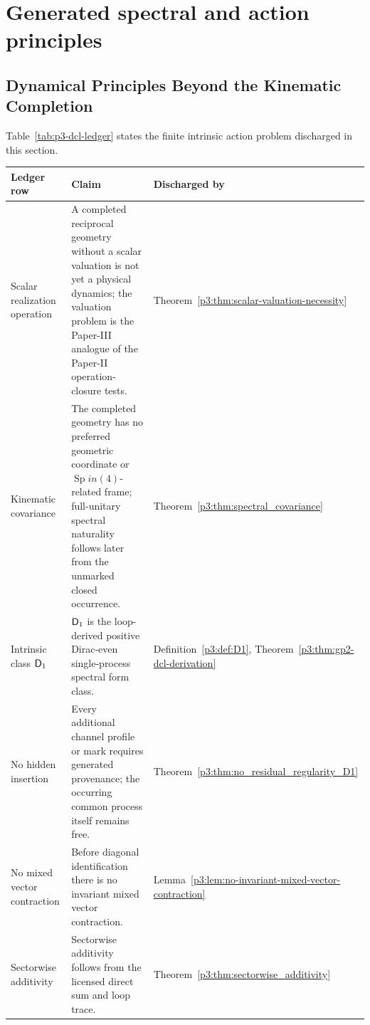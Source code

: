 \documentclass[12pt,a4paper]{article}
\begin{document}
\clearpage
\section{Generated spectral and action principles}
\label{paper3b:sec:organized-principles}
\subsection{Dynamical Principles Beyond the Kinematic Completion}
\label{p3:sec:dyn-principles}

Table~\ref{tab:p3-dcl-ledger} states the finite intrinsic action problem discharged in this section.

\begin{table}[H]
\centering
\small
\begingroup
\setlength{\tabcolsep}{3pt}
\renewcommand{\arraystretch}{1.15}
\begin{tabular}{@{}
  L{3.0cm}
  L{9cm}
  L{\dimexpr\linewidth-12cm-4\tabcolsep\relax}
@{}}
\toprule
\textbf{Ledger row}
& \textbf{Claim}
& \textbf{Discharged by} \\
\midrule
Scalar realization operation
& A completed reciprocal geometry without a scalar valuation is not yet a physical dynamics; the valuation problem is the Paper-III analogue of the Paper-II operation-closure tests.
& Theorem~\ref{p3:thm:scalar-valuation-necessity} \\

Kinematic covariance
& The completed geometry has no preferred geometric coordinate or
\(\operatorname{Sp}in(4)\)-related frame; full-unitary spectral naturality follows later
from the unmarked closed occurrence.
& Theorem~\ref{p3:thm:spectral_covariance} \\

Intrinsic class \(\mathsf{D}_1\)
& \(\mathsf{D}_1\) is the loop-derived positive Dirac-even single-process spectral form class.
& Definition~\ref{p3:def:D1}, Theorem~\ref{p3:thm:gp2-dcl-derivation} \\

No hidden insertion
& Every additional channel profile or mark requires generated provenance;
the occurring common process itself remains free.
& Theorem~\ref{p3:thm:no_residual_regularity_D1} \\

No mixed vector contraction
& Before diagonal identification there is no invariant mixed vector contraction.
& Lemma~\ref{p3:lem:no-invariant-mixed-vector-contraction} \\

Sectorwise additivity
& Sectorwise additivity follows from the licensed direct sum and loop trace.
& Theorem~\ref{p3:thm:sectorwise_additivity} \\


\end{tabular}
\end{table}
\end{document}
